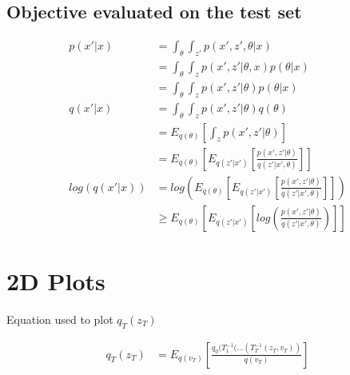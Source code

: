\documentclass{article}
\begin{document}
\subsection{Objective evaluated on the test set}


\begin{align}
    p(x'|x) &= \int_{\theta} \int_{z'} p(x',z',\theta|x) \\
    &= \int_{\theta} \int_{z} p(x',z'|\theta,x) p(\theta|x) \\
    &= \int_{\theta} \int_{z} p(x',z'|\theta) p(\theta|x) \\
    q(x'|x) &= \int_{\theta} \int_{z} p(x',z'|\theta) q(\theta) \\
    &= E_{q(\theta)} \left[ \int_{z} p(x',z'|\theta) \right] \\
    &= E_{q(\theta)} \left[ E_{q(z'|x')} \left[ \frac{p(x',z'|\theta)}{q(z'|x',\theta)} \right] \right]  \\
	log(q(x'|x)) &= log \left(  E_{q(\theta)} \left[ E_{q(z'|x')} \left[ \frac{p(x',z'|\theta)}{q(z'|x',\theta)}  \right ] \right ] \right) \\
    &\geq   E_{q(\theta)} \left[ E_{q(z'|x')} \left[ log \left( \frac{p(x',z'|\theta)}{q(z'|x',\theta)} \right) \right ] \right ] 
\end{align}





\section{2D Plots}

Equation used to plot $q_{T}(z_{T})$

\begin{align}
    q_{T}(z_{T}) &= E_{q(v_T)} \left[ \frac {q_{0}(T_{1}^{-1}(...(T_{T}^{-1}(z_{T},v_{T}))} { q(v_{T})}  \right ]
\end{align}
\end{document}

